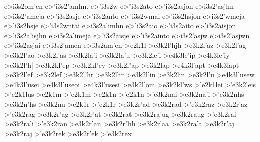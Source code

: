 {	e>i3s2om'en
%
	e>'i3s2'amhn.
	e>'i3s2w
	e>'i3s2ato
	e>'i3s2asjon
	e>i3s2'asjhn
	e>i3s2'ameja
	e>'i3s2asje
	e>'i3s2anto
%
	e>'i3s2wmai
	e>'i3s2hsjon
	e>i3s2'wmeja
	e>'i3s2hsje
	e>'i3s2wntai
%
	e>i3s2a'imhn
	e>'i3s2aio
	e>'i3s2aito
	e>'i3s2aisjon
	e>'i3s2a'isjhn
	e>i3s2a'imeja
	e>'i3s2aisje
	e>'i3s2ainto
%
	e>i3s2'asjw
	e>i3s2'asjwn
%
	e>'i3s2asjai
	e>i3s2'amen		%
	e>i3s2am'en
%	
>e2k1l 			%
	>e3k2l'hjh  		%
	>e3k2l'az   		%
	>e3k2l'ag  		%
	>e3k2l'ao		%
	>e3k2l'as		%
	>e3k2la'i		%
	>e3k2la'u   		%
	>e3k2le'i		%
		>e4k3le'ip		%
		>e4k3le'iy		%
	>e3k2l'h|		%
	>e3k2kl'ep		%
	>e3k2kl'ey		%
	>e3k2l'ap   		%
	>e3k2lap		%
		>e4k3l'apt  		%
		>e4k3lapt
	>e3k2l'ef		%
	>e3k2lef		%
	>e3k2l'hr		%
	>e3k2lhr 		%
	>e3k2l'in		%
	>e3k2lin		%
	>e3k2l'u		%
		>e4k3l'usew		%
		>e4k3l'usei
		>e4k3l'useoi
		>e4k3l'usesi
	>e3k2l'om   		%
	>e3k2kl'ws		%
>'e2k1lei       		%
	>'e3k2leis		%
>'e2k1lus	       		%
>e2k1m
>'e2k1m
>e2k1n
>'e2k1n
	>'e3k2nai		%
	>e3k2na'i		%
	>'e3k2nhs		%
	>e3k2n'hs		%
	>e3k2nu    		%
>e2k1r
>'e2k1r
	>e3k2r'ad		%
	>e3k2rad
	>'e3k2raz		%
	>e3k2r'az
	>'e3k2rag		%
	>e3k2r'ag
	>e3k2r'at		%
	>e3k2rat
	>e3k2ra'ug		%
	>e3k2raug
	>'e3k2rai		%
	>e3k2ra'i
	>'e3k2ran		%
	>e3k2r'an
	>e3k2r'hh		%
	>e3k2r'aa
	>e3k2ra'a
	>e3k2r'aj  		%
	>e3k2raj
	>'e3k2rek		%
	>e3k2r'ek
	>'e3k2rex 		%
}
